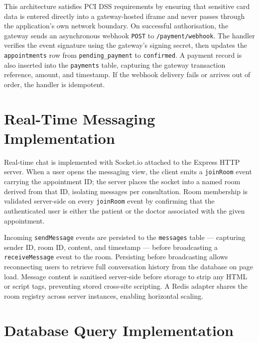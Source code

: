 \justifying
\noindent This architecture satisfies PCI DSS requirements by ensuring that sensitive card data is entered directly into a gateway-hosted iframe and never passes through the application's own network boundary. On successful authorisation, the gateway sends an asynchronous webhook \texttt{POST} to \texttt{/payment/webhook}. The handler verifies the event signature using the gateway's signing secret, then updates the \texttt{appointments} row from \texttt{pending\_payment} to \texttt{confirmed}. A payment record is also inserted into the \texttt{payments} table, capturing the gateway transaction reference, amount, and timestamp. If the webhook delivery fails or arrives out of order, the handler is idempotent.

\section{Real-Time Messaging Implementation}
\label{sec:messaging}

\justifying
\noindent Real-time chat is implemented with Socket.io attached to the Express HTTP server. When a user opens the messaging view, the client emits a \texttt{joinRoom} event carrying the appointment ID; the server places the socket into a named room derived from that ID, isolating messages per consultation. Room membership is validated server-side on every \texttt{joinRoom} event by confirming that the authenticated user is either the patient or the doctor associated with the given appointment.

\justifying
\noindent Incoming \texttt{sendMessage} events are persisted to the \texttt{messages} table — capturing sender ID, room ID, content, and timestamp — before broadcasting a \texttt{receiveMessage} event to the room. Persisting before broadcasting allows reconnecting users to retrieve full conversation history from the database on page load. Message content is sanitised server-side before storage to strip any HTML or script tags, preventing stored cross-site scripting. A Redis adapter shares the room registry across server instances, enabling horizontal scaling.

\section{Database Query Implementation}
\label{sec:db-queries}

